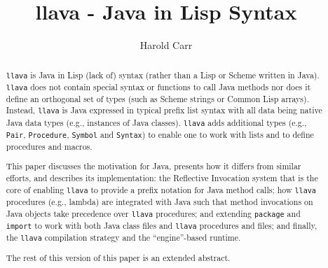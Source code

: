 \documentclass{acm-final/sig-alternate-modified}
\begin{document}


\title{llava - Java in Lisp Syntax}


\author{
\alignauthor Harold Carr \\
}


\maketitle

\begin{abstract}

{\tt llava} is Java in Lisp (lack of) syntax (rather than a Lisp or
Scheme written in Java).  {\tt llava} does not contain special syntax
or functions to call Java methods nor does it define an orthogonal set
of types (such as Scheme strings or Common Lisp arrays).  Instead,
{\tt llava} is Java expressed in typical prefix list syntax with all
data being native Java data types (e.g., instances of Java classes).
{\tt llava} adds additional types (e.g., {\tt Pair}, {\tt Procedure},
{\tt Symbol} and {\tt Syntax}) to enable one to work with lists and to
define procedures and macros.

This paper discusses the motivation for Java, presents how it differs
from similar efforts, and describes its implementation: the
Reflective Invocation system that is the core of enabling {\tt llava}
to provide a prefix notation for Java method calls; how {\tt llava}
procedures (e.g., lambda) are integrated with Java such that method
invocations on Java objects take precedence over {\tt llava}
procedures; and extending {\tt package} and {\tt import} to work with
both Java class files and {\tt llava} procedures and files; and
finally, the {\tt llava} compilation strategy and the ``engine''-based
runtime.

The rest of this version of this paper is an extended abstract.

\end{abstract}


\end{document}
